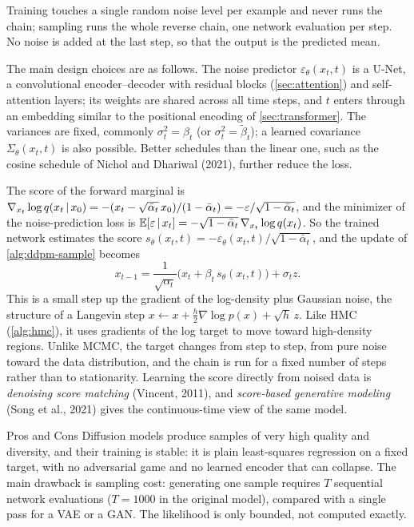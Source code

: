 Training touches a single random noise level per example and never runs the chain; sampling runs the whole reverse chain, one network evaluation per step. No noise is added at the last step, so that the output is the predicted mean.

The main design choices are as follows. The noise predictor $\varepsilon_\theta(x_t,t)$ is a U-Net, a convolutional encoder--decoder with residual blocks (\cref{sec:attention}) and self-attention layers; its weights are shared across all time steps, and $t$ enters through an embedding similar to the positional encoding of \cref{sec:transformer}. The variances are fixed, commonly $\sigma_t^2=\beta_t$ (or $\sigma_t^2=\tilde\beta_t$); a learned covariance $\Sigma_\theta(x_t,t)$ is also possible. Better schedules than the linear one, such as the cosine schedule of Nichol and Dhariwal (2021), further reduce the loss.

\begin{remark}\label{rem:ddpm-langevin}
The score of the forward marginal is $\nabla_{x_t}\log q(x_t\,|\, x_0)=-(x_t-\sqrt{\bar\alpha_t}\,x_0)/(1-\bar\alpha_t)=-\varepsilon/\sqrt{1-\bar\alpha_t}$, and the minimizer of the noise-prediction loss is $\mathbb{E}[\varepsilon\,|\, x_t]=-\sqrt{1-\bar\alpha_t}\,\nabla_{x_t}\log q(x_t)$. So the trained network estimates the score $s_\theta(x_t,t)=-\varepsilon_\theta(x_t,t)/\sqrt{1-\bar\alpha_t}$, and the update of \cref{alg:ddpm-sample} becomes
\[
x_{t-1}=\frac{1}{\sqrt{\alpha_t}}\big(x_t+\beta_t\,s_\theta(x_t,t)\big)+\sigma_tz.
\]
This is a small step up the gradient of the log-density plus Gaussian noise, the structure of a Langevin step $x\gets x+\tfrac h2\nabla\log p(x)+\sqrt h\,z$. Like HMC (\cref{alg:hmc}), it uses gradients of the log target to move toward high-density regions. Unlike MCMC, the target changes from step to step, from pure noise toward the data distribution, and the chain is run for a fixed number of steps rather than to stationarity. Learning the score directly from noised data is \emph{denoising score matching} (Vincent, 2011), and \emph{score-based generative modeling} (Song et al., 2021) gives the continuous-time view of the same model.
\end{remark}

\begin{notebox}{Pros and Cons}
Diffusion models produce samples of very high quality and diversity, and their training is stable: it is plain least-squares regression on a fixed target, with no adversarial game and no learned encoder that can collapse. The main drawback is sampling cost: generating one sample requires $T$ sequential network evaluations ($T=1000$ in the original model), compared with a single pass for a VAE or a GAN. The likelihood is only bounded, not computed exactly.
\end{notebox}

